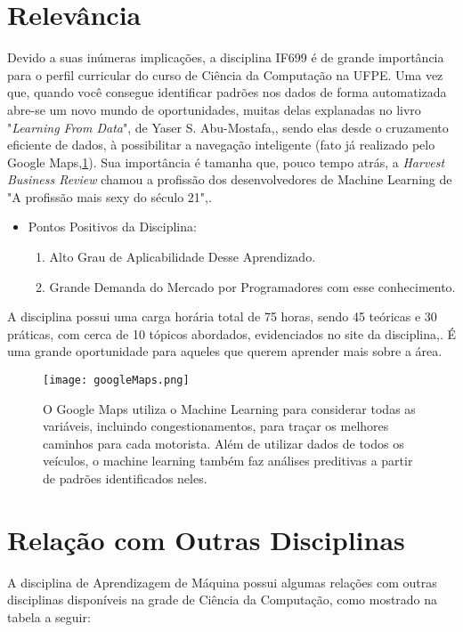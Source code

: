 \documentclass[a4paper]{article}
\begin{document}
\section{Relevância}
Devido a suas inúmeras implicações, a disciplina IF699 é de grande importância para o perfil curricular do curso de Ciência da Computação na UFPE. Uma vez que, quando você consegue identificar padrões nos dados de forma automatizada abre-se um novo mundo de oportunidades, muitas delas explanadas no livro "\textit{Learning From Data}", de Yaser S. Abu-Mostafa,\cite{book:mostafa}, sendo elas desde o cruzamento eficiente de dados, à possibilitar a navegação inteligente (fato já realizado pelo Google Maps,\ref{fig:gm}). Sua importância é tamanha que, pouco tempo atrás, a \textit{Harvest Business Review} chamou a profissão dos desenvolvedores de Machine Learning de "A profissão mais sexy do século 21",\cite{url:hbr}.
\begin{itemize}
  \item Pontos Positivos da Disciplina:
  \begin{enumerate}
     \item Alto Grau de Aplicabilidade Desse Aprendizado.
     \item Grande Demanda do Mercado por Programadores com esse conhecimento.
   \end{enumerate}
\end{itemize}
A disciplina possui uma carga horária total de 75 horas, sendo 45 teóricas e 30 práticas, com cerca de 10 tópicos abordados, evidenciados no site da disciplina,\cite{url:if699}. É uma grande oportunidade para aqueles que querem aprender mais sobre a área.
\begin{figure}
\centering
\texttt{[image: googleMaps.png]}
\caption{\label{fig:gm} O Google Maps utiliza o Machine Learning para considerar todas as variáveis, incluindo congestionamentos, para traçar os melhores caminhos para cada motorista. Além de utilizar dados de todos os veículos, o machine learning também faz análises preditivas a partir de padrões identificados neles.}
\end{figure}

\section{Relação com Outras Disciplinas}
A disciplina de Aprendizagem de  Máquina possui algumas relações com outras disciplinas disponíveis na grade de Ciência da Computação, como mostrado na tabela a seguir:
\end{document}
